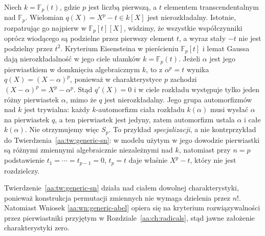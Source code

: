 \begin{przyklad}
\label{aa:prz:generic-inseparable-specialization}
Niech $k=\mathbb F_p(t)$, gdzie $p$ jest liczbą pierwszą,
a $t$ elementem transcendentalnym nad $\mathbb F_p$.
Wielomian $q(X)=X^p-t\in k[X]$ jest nierozkładalny.
Istotnie, rozpatrując go najpierw w $\mathbb F_p[t][X]$,
widzimy, że wszystkie współczynniki oprócz wiodącego są
podzielne przez pierwszy element $t$, a wyraz stały $-t$
nie jest podzielny przez $t^2$. Kryterium Eisensteina
w pierścieniu $\mathbb F_p[t]$ i lemat Gaussa dają
nierozkładalność w jego ciele ułamków $k=\mathbb F_p(t)$.
Jeżeli $\alpha$ jest jego pierwiastkiem w domknięciu
algebraicznym $k$, to z $\alpha^p=t$ wynika
$q(X)=(X-\alpha)^p$, ponieważ w charakterystyce $p$
zachodzi $(X-\alpha)^p=X^p-\alpha^p$.
Stąd $q'(X)=0$ i w ciele rozkładu występuje tylko jeden
różny pierwiastek $\alpha$, mimo że $q$ jest nierozkładalny.
Jego grupa automorfizmów nad $k$
jest trywialna: każdy $k$-automorfizm ciała rozkładu
$k(\alpha)$ musi wysłać $\alpha$ na pierwiastek $q$,
a ten pierwiastek jest jedyny, zatem automorfizm ustala
$\alpha$ i całe $k(\alpha)$. Nie otrzymujemy więc $S_p$.
To przykład \emph{specjalizacji}, a nie kontrprzykład do
Twierdzenia~\ref{aa:tw:generic-sn}: w modelu użytym w jego dowodzie
pierwiastki są różnymi zmiennymi algebraicznie niezależnymi nad $k$,
natomiast przy $n=p$ podstawienie $t_1=\cdots=t_{p-1}=0$,
$t_p=t$ daje właśnie $X^p-t$, który nie jest rozdzielczy.
\end{przyklad}

\begin{uwaga}\label{aa:uw:generic-characteristic}
Twierdzenie~\ref{aa:tw:generic-sn} działa nad ciałem dowolnej
charakterystyki, ponieważ konstrukcja permutacji zmiennych nie
wymaga dzielenia przez $n!$. Natomiast Wniosek
\ref{aa:wn:generic-abel} opiera się na kryterium rozwiązywalności
przez pierwiastniki przyjętym w Rozdziale~\ref{aa:ch:radicals},
stąd jawne założenie charakterystyki zero.
\end{uwaga}
